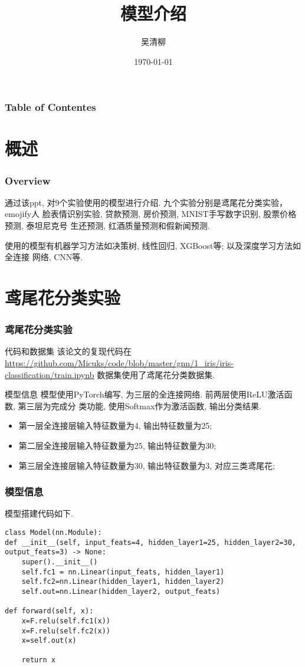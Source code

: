 \documentclass{beamer}
\title{模型介绍}
\author{吴清柳}
\institute{Beijing University of Posts and Telecommunications}
\date{\today}
\begin{document}
\AtBeginSection{\tableofcontents[currentsection]}
\maketitle

\begin{frame}
	\frametitle{Table of Contentes}
	\tableofcontents
\end{frame}

\section{概述}
\begin{frame}
	\frametitle{Overview}
	通过该ppt, 对9个实验使用的模型进行介绍. 九个实验分别是鸢尾花分类实验，emojify人
	脸表情识别实验, 贷款预测, 房价预测, MNIST手写数字识别, 股票价格预测, 泰坦尼克号
	生还预测, 红酒质量预测和假新闻预测.

	使用的模型有机器学习方法如决策树, 线性回归, XGBoost等; 以及深度学习方法如全连接
	网络, CNN等.
\end{frame}

\section{鸢尾花分类实验}
\begin{frame}
	\frametitle{鸢尾花分类实验}
	\begin{block}{代码和数据集}
		该论文的复现代码在\href{这里}{https://github.com/Micuks/code/blob/master/gnn/1\_iris/iris-classification/train.ipynb}
		数据集使用了鸢尾花分类数据集.
	\end{block}

	\begin{block}{模型信息}
		模型使用PyTorch编写, 为三层的全连接网络. 前两层使用ReLU激活函数, 第三层为完成分
		类功能, 使用Softmax作为激活函数, 输出分类结果.
		\begin{itemize}
			\item 第一层全连接层输入特征数量为4, 输出特征数量为25;
			\item 第二层全连接层输入特征数量为25, 输出特征数量为30;
			\item 第三层全连接层输入特征数量为30, 输出特征数量为3, 对应三类鸢尾花;
		\end{itemize}
	\end{block}
\end{frame}

\begin{frame}[fragile]
	\frametitle{模型信息}
	模型搭建代码如下.
	\begin{verbatim}
class Model(nn.Module):
def __init__(self, input_feats=4, hidden_layer1=25, hidden_layer2=30, output_feats=3) -> None:
	super().__init__()
	self.fc1 = nn.Linear(input_feats, hidden_layer1)
	self.fc2=nn.Linear(hidden_layer1, hidden_layer2)
	self.out=nn.Linear(hidden_layer2, output_feats)

def forward(self, x):
	x=F.relu(self.fc1(x))
	x=F.relu(self.fc2(x))
	x=self.out(x)

	return x
	\end{verbatim}
\end{frame}
\end{document}

